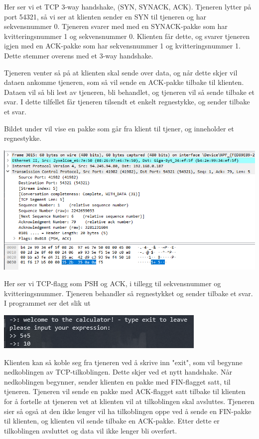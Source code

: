 \documentclass[12pt]{article}
\begin{document}
    Her ser vi et TCP 3-way handshake, (SYN, SYNACK, ACK). Tjeneren lytter på
    port 54321, så vi ser at klienten sender en SYN til tjeneren og har sekvensnummer 0.
    Tjeneren svarer med med en SYNACK-pakke som har kvitteringsnummer 1 og sekvensnummer 0.
    Klienten får dette, og svarer tjeneren igjen med en ACK-pakke
    som har sekvensnummer 1 og kvitteringsnummer 1. Dette stemmer overens med et 3-way handshake.

    Tjeneren venter så på at klienten skal sende over data, og når dette skjer vil dataen
    ankomme tjeneren, som så vil sende en ACK-pakke tilbake til klienten. Dataen vil så 
    bli lest av tjeneren, bli behandlet, og tjeneren vil så sende tilbake et svar. I dette 
    tilfellet får tjeneren tilsendt et enkelt regnestykke, og sender tilbake et svar.

    Bildet under vil vise en pakke som går fra klient til tjener, og inneholder et regnestykke.

    \begin{center}
        \includegraphics[width=\linewidth]{assets/5K1kvx9.png}
    \end{center}
    
    Her ser vi TCP-flagg som PSH og ACK, i tillegg til sekvensnummer og kvitteringsnummer. 
    Tjeneren behandler så regnestykket og sender tilbake et svar. I programmet ser det slik ut

    \begin{center}
        \includegraphics{assets/7j3MtCt.png}
    \end{center}

    Klienten kan så koble seg fra tjeneren ved å skrive inn "exit", som vil begynne 
    nedkoblingen av TCP-tilkoblingen. Dette skjer ved et nytt handshake. Når nedkoblingen 
    begynner, sender klienten en pakke med FIN-flagget satt, til tjeneren. Tjeneren vil sende en 
    pakke med ACK-flagget satt tilbake til klienten for å fortelle at tjeneren vet at klienten vil 
    at tilkoblingen skal avsluttes. Tjeneren sier så også at den ikke lenger vil ha tilkoblingen 
    oppe ved å sende en FIN-pakke til klienten, og klienten vil sende tilbake en ACK-pakke.
    Etter dette er tilkoblingen avsluttet og data vil ikke lenger bli overført.
\end{document}

